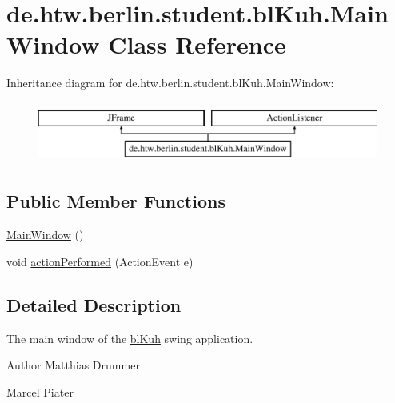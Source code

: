 \hypertarget{classde_1_1htw_1_1berlin_1_1student_1_1bl_kuh_1_1_main_window}{\section{de.\-htw.\-berlin.\-student.\-bl\-Kuh.\-Main\-Window Class Reference}
\label{classde_1_1htw_1_1berlin_1_1student_1_1bl_kuh_1_1_main_window}
}
Inheritance diagram for de.\-htw.\-berlin.\-student.\-bl\-Kuh.\-Main\-Window\-:\begin{figure}[H]
\begin{center}
\leavevmode
\includegraphics[height=2.000000cm]{classde_1_1htw_1_1berlin_1_1student_1_1bl_kuh_1_1_main_window}
\end{center}
\end{figure}
\subsection*{Public Member Functions}
\begin{DoxyCompactItemize}
\item 
\hyperlink{classde_1_1htw_1_1berlin_1_1student_1_1bl_kuh_1_1_main_window_af0fa47179b560817fe6c1da31fe4ed53}{Main\-Window} ()
\item 
void \hyperlink{classde_1_1htw_1_1berlin_1_1student_1_1bl_kuh_1_1_main_window_a5f1f3104069bf2aa0ba76471f7a70767}{action\-Performed} (Action\-Event e)
\end{DoxyCompactItemize}


\subsection{Detailed Description}
The main window of the \hyperlink{namespacede_1_1htw_1_1berlin_1_1student_1_1bl_kuh}{bl\-Kuh} swing application.

\begin{DoxyAuthor}{Author}
Matthias Drummer 

Marcel Piater 
\end{DoxyAuthor}


